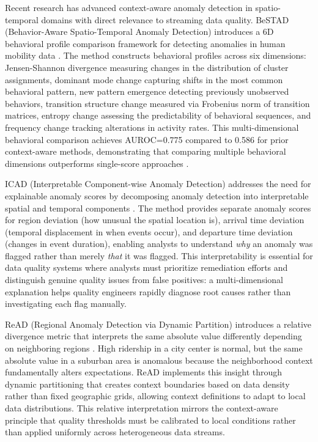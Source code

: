 Recent research has advanced context-aware anomaly detection in spatio-temporal domains with direct relevance to streaming data quality. BeSTAD (Behavior-Aware Spatio-Temporal Anomaly Detection) introduces a 6D behavioral profile comparison framework for detecting anomalies in human mobility data \citep{bestad2025}. The method constructs behavioral profiles across six dimensions: Jensen-Shannon divergence measuring changes in the distribution of cluster assignments, dominant mode change capturing shifts in the most common behavioral pattern, new pattern emergence detecting previously unobserved behaviors, transition structure change measured via Frobenius norm of transition matrices, entropy change assessing the predictability of behavioral sequences, and frequency change tracking alterations in activity rates. This multi-dimensional behavioral comparison achieves AUROC=0.775 compared to 0.586 for prior context-aware methods, demonstrating that comparing multiple behavioral dimensions outperforms single-score approaches \citep{bestad2025}.

ICAD (Interpretable Component-wise Anomaly Detection) addresses the need for explainable anomaly scores by decomposing anomaly detection into interpretable spatial and temporal components \citep{icad2025}. The method provides separate anomaly scores for region deviation (how unusual the spatial location is), arrival time deviation (temporal displacement in when events occur), and departure time deviation (changes in event duration), enabling analysts to understand \emph{why} an anomaly was flagged rather than merely \emph{that} it was flagged. This interpretability is essential for data quality systems where analysts must prioritize remediation efforts and distinguish genuine quality issues from false positives: a multi-dimensional explanation helps quality engineers rapidly diagnose root causes rather than investigating each flag manually.

ReAD (Regional Anomaly Detection via Dynamic Partition) introduces a relative divergence metric that interprets the same absolute value differently depending on neighboring regions \citep{read2020}. High ridership in a city center is normal, but the same absolute value in a suburban area is anomalous because the neighborhood context fundamentally alters expectations. ReAD implements this insight through dynamic partitioning that creates context boundaries based on data density rather than fixed geographic grids, allowing context definitions to adapt to local data distributions. This relative interpretation mirrors the context-aware principle that quality thresholds must be calibrated to local conditions rather than applied uniformly across heterogeneous data streams.

